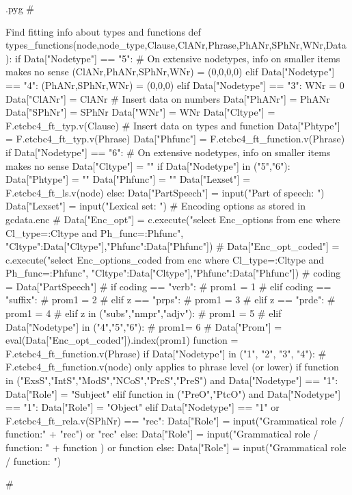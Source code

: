\documentclass{report}
\makeatletter
\newenvironment{python}{%
  \VerbatimEnvironment
  \minted@resetoptions
  \setkeys{minted@opt}{}
      \begin{VerbatimOut}{\jobname.pyg}}
{%
      \end{VerbatimOut}
      \minted@pygmentize{python}
      \DeleteFile{\jobname.pyg}}
\makeatother
\begin{document}
\begin{python}
#{{{ Find fitting info about types and functions
def types_functions(node,node_type,Clause,ClANr,Phrase,PhANr,SPhNr,WNr,Data):
    if Data["Nodetype"] == "5":                # On extensive nodetypes, info on smaller items makes no sense
        (ClANr,PhANr,SPhNr,WNr) = (0,0,0,0)
    elif Data["Nodetype"] == "4":
        (PhANr,SPhNr,WNr) = (0,0,0)
    elif Data["Nodetype"] == "3":
        WNr = 0
    Data["ClANr"] = ClANr                      # Insert data on numbers
    Data["PhANr"] = PhANr
    Data["SPhNr"] = SPhNr
    Data["WNr"] = WNr
    Data["Cltype"] = F.etcbc4_ft_typ.v(Clause) # Insert data on types and function
    Data["Phtype"] = F.etcbc4_ft_typ.v(Phrase)
    Data["Phfunc"] = F.etcbc4_ft_function.v(Phrase)
    if Data["Nodetype"] == "6":                # On extensive nodetypes, info on smaller items makes no sense
        Data["Cltype"] = ""
    if Data["Nodetype"] in ("5","6"):
        Data["Phtype"] = ""
        Data["Phfunc"] = ""
        Data["Lexset"] = F.etcbc4_ft_ls.v(node)
    else:
        Data["PartSpeech"] = input("Part of speech: ")
        Data["Lexset"] = input("Lexical set: ")
        # Encoding options as stored in gcdata.enc
#        Data["Enc_opt"] = c.execute("select Enc_options from enc where Cl_type=:Cltype and Ph_func=:Phfunc", {"Cltype":Data["Cltype"],"Phfunc":Data["Phfunc"]})
#        Data["Enc_opt_coded"] = c.execute("select Enc_options_coded from enc where Cl_type=:Cltype and Ph_func=:Phfunc", {"Cltype":Data["Cltype"],"Phfunc":Data["Phfunc"]})
#        coding = Data["PartSpeech"]
#        if coding == "verb":
#            prom1 = 1
#        elif coding == "suffix":
#            prom1 = 2
#        elif z == "prps":
#            prom1 = 3
#        elif z == "prde":
#            prom1 = 4
#        elif z in ("subs","nmpr","adjv"):
#            prom1 = 5
#        elif Data["Nodetype"] in ("4","5","6"):
#            prom1= 6
#        Data["Prom"] = eval(Data["Enc_opt_coded"]).index(prom1)
    function = F.etcbc4_ft_function.v(Phrase)
    if Data["Nodetype"] in ("1", "2", "3", "4"):    # F.etcbc4_ft_function.v(node) only applies to phrase level (or lower)
        if function in ("ExsS","IntS","ModS","NCoS","PrcS","PreS") and Data["Nodetype"] == "1":
            Data["Role"] = "Subject"
        elif function in ("PreO","PtcO") and Data["Nodetype"] == "1":
            Data["Role"] = "Object"
        elif Data["Nodetype"] == "1" or F.etcbc4_ft_rela.v(SPhNr) == "rec":
            Data["Role"] = input("Grammatical role / function:" + "rec") or "rec"
        else:
            Data["Role"] = input("Grammatical role / function: " + function ) or function
    else:
        Data["Role"] = input("Grammatical role / function: ")

#}}}
\end{python}
\end{document}
